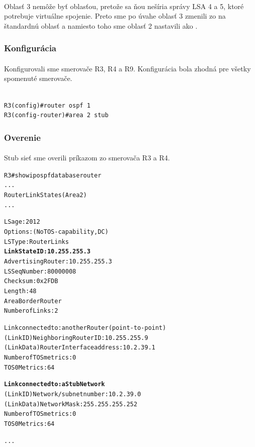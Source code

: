 \documentclass[12pt,twoside,a4paper]{report}
\begin{document}
\paragraph{}
Oblasť 3 nemôže byť  oblasťou, pretože sa ňou nešíria správy LSA 4 a 5, ktoré potrebuje virtuálne spojenie. Preto sme po úvahe oblasť 3 zmenili zo  na štandardnú oblasť a namiesto toho sme oblasť 2 nastavili ako .

\subsubsection{Konfigurácia}
\paragraph{}
Konfigurovali sme smerovače R3, R4 a R9. Konfigurácia bola zhodná pre všetky spomenuté smerovače.

\noindent
{\selectfont
\begin{small}
\begin{verbatim}

R3(config)#router ospf 1
R3(config-router)#area 2 stub

\end{verbatim}
\end{small}
}

\subsubsection{Overenie}
\paragraph{}
Stub sieť sme overili príkazom  zo smerovača R3 a R4.


\noindent
{\selectfont
\begin{small}
\begin{alltt}
R3#show ip ospf database router
...
		Router Link States (Area 2)
...

  LS age: 2012
  Options: (No TOS-capability, DC)
  LS Type: Router Links
  \textbf{Link State ID: 10.255.255.3}
  Advertising Router: 10.255.255.3
  LS Seq Number: 80000008
  Checksum: 0x2FDB
  Length: 48
  Area Border Router
  Number of Links: 2

    Link connected to: another Router (point-to-point)
     (Link ID) Neighboring Router ID: 10.255.255.9
     (Link Data) Router Interface address: 10.2.39.1
      Number of TOS metrics: 0
       TOS 0 Metrics: 64

    \textbf{Link connected to: a Stub Network}
     (Link ID) Network/subnet number: 10.2.39.0
     (Link Data) Network Mask: 255.255.255.252
      Number of TOS metrics: 0
       TOS 0 Metrics: 64

...

\end{alltt}
\end{small}
}
\end{document}
